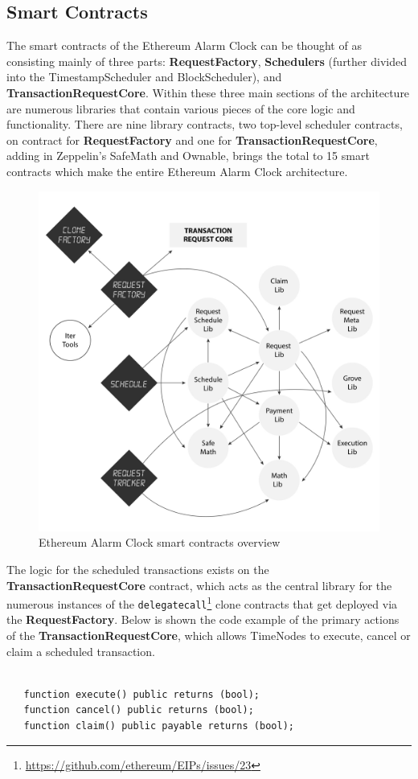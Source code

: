 \documentclass{report}
\begin{document}
  \subsection{Smart Contracts}
  The smart contracts of the Ethereum Alarm Clock can be thought of as consisting mainly of three parts: \textbf{RequestFactory}, \textbf{Schedulers} (further divided into the TimestampScheduler and BlockScheduler), and \textbf{TransactionRequestCore}. Within these three main sections of the architecture are numerous libraries that contain various pieces of the core logic and functionality. There are nine library contracts, two top-level scheduler contracts, on contract for \textbf{RequestFactory} and one for \textbf{TransactionRequestCore}, adding in Zeppelin’s SafeMath and Ownable, brings the total to 15 smart contracts which make the entire Ethereum Alarm Clock architecture.

  \begin{figure}[h]
    \includegraphics[width=\textwidth]{contracts}
    \caption{Ethereum Alarm Clock smart contracts overview}
  \end{figure}

  The logic for the scheduled transactions exists on the \textbf{TransactionRequestCore} contract, which acts as the central library for the numerous instances of the \texttt{delegatecall}\footnote{\url{https://github.com/ethereum/EIPs/issues/23}} clone contracts that get deployed via the \textbf{RequestFactory}. Below is shown the code example of the primary actions of the \textbf{TransactionRequestCore}, which allows TimeNodes to execute, cancel or claim a scheduled transaction.
  \begin{verbatim}

   function execute() public returns (bool);
   function cancel() public returns (bool);
   function claim() public payable returns (bool);

  \end{verbatim}
\end{document}
